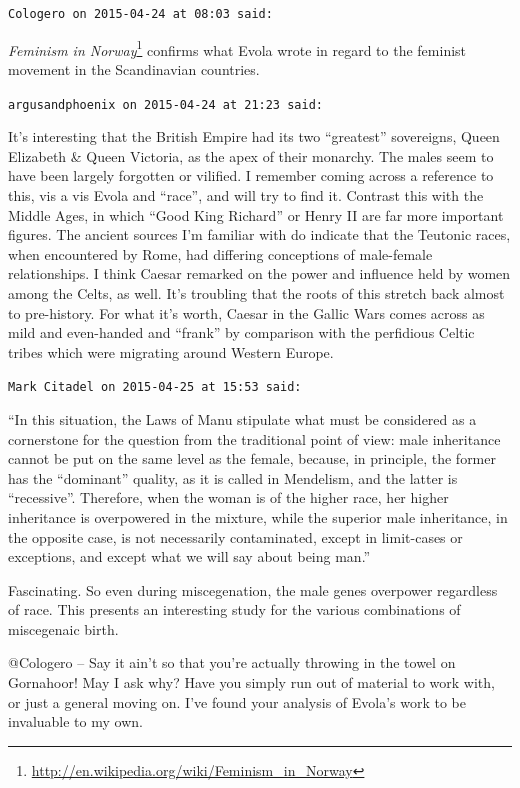 \begin{footnotesize}
\begin{sffamily}
\texttt{Cologero on 2015-04-24 at 08:03 said:}

\textit{Feminism in Norway}\footnote{\url{http://en.wikipedia.org/wiki/Feminism_in_Norway}} confirms what Evola wrote in regard to the feminist movement in the Scandinavian countries.

\hfill

\texttt{argusandphoenix on 2015-04-24 at 21:23 said:}

It's interesting that the British Empire had its two ``greatest'' sovereigns, Queen Elizabeth \& Queen Victoria, as the apex of their monarchy. The males seem to have been largely forgotten or vilified. I remember coming across a reference to this, vis a vis Evola and ``race'', and will try to find it. Contrast this with the Middle Ages, in which ``Good King Richard'' or Henry II are far more important figures. The ancient sources I'm familiar with do indicate that the Teutonic races, when encountered by Rome, had differing conceptions of male-female relationships. I think Caesar remarked on the power and influence held by women among the Celts, as well. It's troubling that the roots of this stretch back almost to pre-history. For what it's worth, Caesar in the Gallic Wars comes across as mild and even-handed and ``frank'' by comparison with the perfidious Celtic tribes which were migrating around Western Europe.

\hfill

\texttt{Mark Citadel on 2015-04-25 at 15:53 said:}

``In this situation, the Laws of Manu stipulate what must be considered as a cornerstone for the question from the traditional point of view: male inheritance cannot be put on the same level as the female, because, in principle, the former has the ``dominant'' quality, as it is called in Mendelism, and the latter is ``recessive''. Therefore, when the woman is of the higher race, her higher inheritance is overpowered in the mixture, while the superior male inheritance, in the opposite case, is not necessarily contaminated, except in limit-cases or exceptions, and except what we will say about being man.''

Fascinating. So even during miscegenation, the male genes overpower regardless of race. This presents an interesting study for the various combinations of miscegenaic birth.

@Cologero -- Say it ain't so that you're actually throwing in the towel on Gornahoor! May I ask why? Have you simply run out of material to work with, or just a general moving on. I've found your analysis of Evola's work to be invaluable to my own.


\end{sffamily}
\end{footnotesize}

